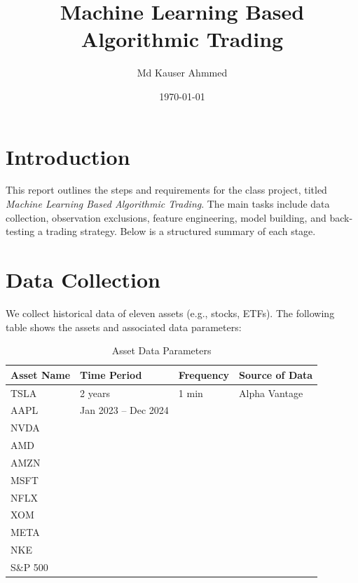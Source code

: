 \documentclass[11pt]{article}
\title{Machine Learning Based Algorithmic Trading}
\author{Md Kauser Ahmmed}
\date{\today}
\begin{document}
\maketitle

\section{Introduction}
This report outlines the steps and requirements for the class project, titled \textit{Machine Learning Based Algorithmic Trading}. The main tasks include data collection, observation exclusions, feature engineering, model building, and back-testing a trading strategy. Below is a structured summary of each stage.

\section{Data Collection}
We collect historical data of eleven assets (e.g., stocks, ETFs). The following table shows the assets and associated data parameters:

\begin{table}[ht]
    \centering
    \begin{tabular}{|l|l|l|l|}
        \hline
        \textbf{Asset Name} & \textbf{Time Period} & \textbf{Frequency} & \textbf{Source of Data} \\ \hline
        TSLA                & 2 years              & 1 min              & Alpha Vantage           \\ \hline
        AAPL                & Jan 2023 -- Dec 2024 &                   &                         \\ \hline
        NVDA                &                      &                   &                         \\ \hline
        AMD                 &                      &                   &                         \\ \hline
        AMZN                &                      &                   &                         \\ \hline
        MSFT                &                      &                   &                         \\ \hline
        NFLX                &                      &                   &                         \\ \hline
        XOM                 &                      &                   &                         \\ \hline
        META                &                      &                   &                         \\ \hline
        NKE                 &                      &                   &                         \\ \hline
        S\&P 500            &                      &                   &                         \\ \hline
    \end{tabular}
    \caption{Asset Data Parameters}
    \label{tab:asset_data}
\end{table}
\end{document}
